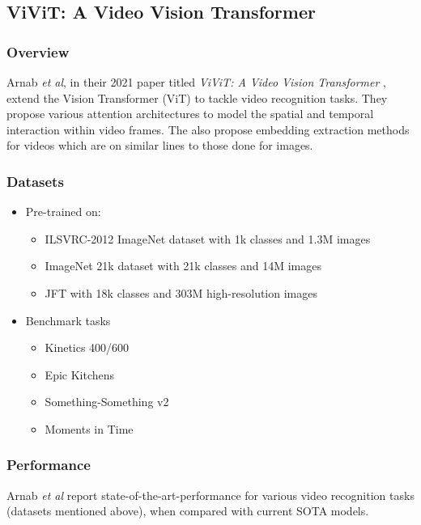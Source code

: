 \subsection{ViViT: A Video Vision Transformer}

\subsubsection{Overview}

\par Arnab \textit{et al}, in their 2021 paper titled \textit{ViViT: A Video Vision Transformer} \cite{vivit}, extend the Vision Transformer (ViT) \cite{vit} to tackle video recognition tasks. 
They propose various attention architectures to model the spatial and temporal interaction within video frames. 
The also propose embedding extraction methods for videos which are on similar lines to those done for images. \par

\subsubsection{Datasets}
\begin{itemize}
\item Pre-trained on:
	\begin{itemize}
		\item ILSVRC-2012 ImageNet dataset with 1k classes and 1.3M images
		\item ImageNet 21k dataset with 21k classes and 14M images 
		\item JFT with 18k classes and 303M high-resolution images
	\end{itemize}
\item Benchmark tasks
	\begin{itemize}
		\item Kinetics 400/600
		\item Epic Kitchens
		\item Something-Something v2
		\item Moments in Time
	\end{itemize}
\end{itemize}


\subsubsection{Performance}
\par Arnab \textit{et al} report state-of-the-art-performance for various video recognition tasks (datasets mentioned above), when compared with current SOTA models.\par


